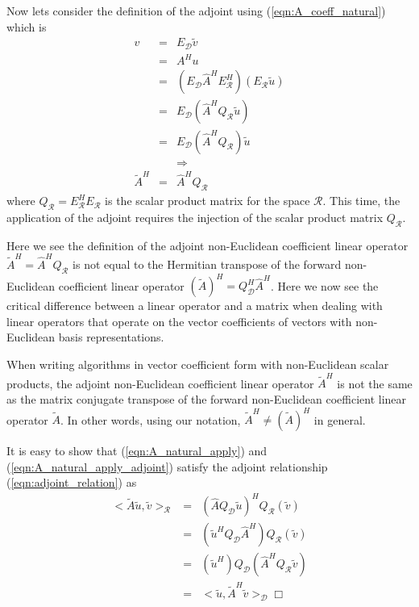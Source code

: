 Now lets consider the definition of the adjoint using (\ref{eqn:A_coeff_natural}) which is
%
\begin{eqnarray}
v
& = & E_{\mathcal{D}} \tilde{v} \nonumber \\
& = & A^H u \nonumber \\
& = & ( E_{\mathcal{D}} \hat{A}^H E_{\mathcal{R}}^H ) ( E_{\mathcal{R}} \tilde{u} ) \nonumber \\
& = & E_{\mathcal{D}} ( \hat{A}^H Q_{\mathcal{R}} \tilde{u} ) \nonumber \\
& = & E_{\mathcal{D}} ( \hat{A}^H Q_{\mathcal{R}} ) \tilde{u} \nonumber \\
&  & \Rightarrow \nonumber \\
\tilde{A}^H & = & \hat{A}^H Q_{\mathcal{R}}
\label{eqn:A_natural_apply_adjoint}
\end{eqnarray}
%
where $Q_{\mathcal{R}} = E_{\mathcal{R}}^H E_{\mathcal{R}}$ is the scalar
product matrix for the space $\mathcal{R}$.  This time, the application of the
adjoint requires the injection of the scalar product matrix
$Q_{\mathcal{R}}$.

Here we see the definition of the adjoint non-Euclidean coefficient linear
operator $\tilde{A}^H=\hat{A}^H Q_{\mathcal{R}}$ is not equal to the Hermitian
transpose of the forward non-Euclidean coefficient linear operator
$(\tilde{A})^H = Q_{\mathcal{D}}^H {}\hat{A}^H$.  Here we now see the critical
difference between a linear operator and a matrix when dealing with linear
operators that operate on the vector coefficients of vectors with
non-Euclidean basis representations.

\begin{dumb_fact}
When writing algorithms in vector coefficient form with non-Euclidean scalar
products, the adjoint non-Euclidean coefficient linear operator $\tilde{A}^H$
is not the same as the matrix conjugate transpose of the forward non-Euclidean
coefficient linear operator $\tilde{A}$.  In other words, using our notation,
$\tilde{A}^H {}\ne (\tilde{A})^H$ in general.
\end{dumb_fact}

It is easy to show that (\ref{eqn:A_natural_apply}) and
(\ref{eqn:A_natural_apply_adjoint}) satisfy the adjoint relationship
(\ref{eqn:adjoint_relation}) as
%
\begin{eqnarray}
<\tilde{A} \tilde{u}, \tilde{v}>_{\mathcal{R}}
& = & (\hat{A} Q_{\mathcal{D}} \tilde{u} )^H Q_{\mathcal{R}} (\tilde{v}) \nonumber \\
& = & ( \tilde{u}^H Q_{\mathcal{D}} \hat{A}^H ) Q_{\mathcal{R}} (\tilde{v}) \nonumber \\
& = & (\tilde{u}^H ) Q_{\mathcal{D}} ( \hat{A}^H Q_{\mathcal{R}} \tilde{v}) \nonumber \\
& = & <\tilde{u}, \tilde{A}^H \tilde{v}>_{\mathcal{D}} \Box
\label{eqn:adjoint_relation_proved}
\end{eqnarray}
%

